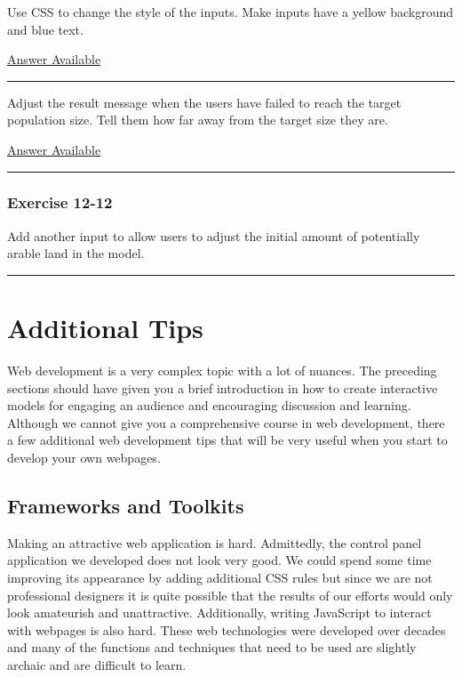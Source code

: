 \documentclass[]{memoir}
\begin{document}
Use CSS to change the style of the inputs. Make inputs have a yellow
background and blue text.

\hyperref[Ans-12-10]{Answer Available}

\begin{center}\rule{3in}{0.4pt}\end{center}


Adjust the result message when the users have failed to reach the target
population size. Tell them how far away from the target size they are.

\hyperref[Ans-12-11]{Answer Available}

\begin{center}\rule{3in}{0.4pt}\end{center}

\subsubsection{Exercise 12-12}

Add another input to allow users to adjust the initial amount of
potentially arable land in the model.

\begin{center}\rule{3in}{0.4pt}\end{center}

\section{Additional Tips}

Web development is a very complex topic with a lot of nuances. The
preceding sections should have given you a brief introduction in how to
create interactive models for engaging an audience and encouraging
discussion and learning. Although we cannot give you a comprehensive
course in web development, there a few additional web development tips
that will be very useful when you start to develop your own webpages.

\subsection{Frameworks and Toolkits}

Making an attractive web application is hard. Admittedly, the control
panel application we developed does not look very good. We could spend
some time improving its appearance by adding additional CSS rules but
since we are not professional designers it is quite possible that the
results of our efforts would only look amateurish and unattractive.
Additionally, writing JavaScript to interact with webpages is also hard.
These web technologies were developed over decades and many of the
functions and techniques that need to be used are slightly archaic and
are difficult to learn.
\end{document}
